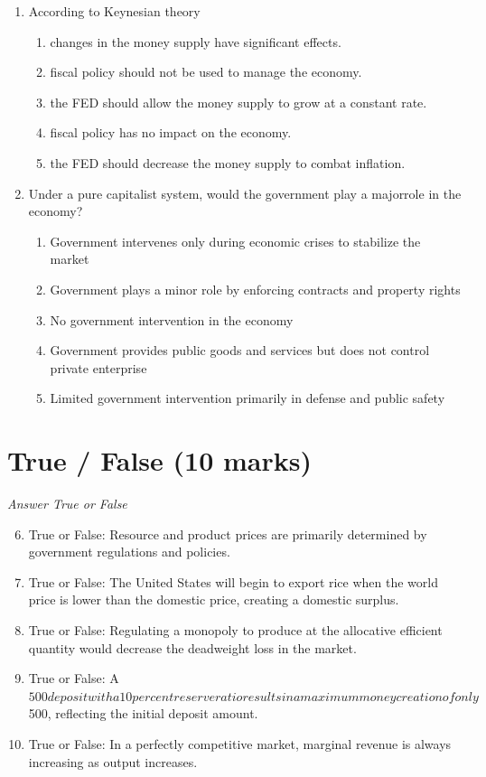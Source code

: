 \documentclass[12pt]{article}
\begin{document}
\begin{enumerate}[label=\arabic*.]
\item According to Keynesian theory
\begin{enumerate}[label=(\alph*)]
    \item changes in the money supply have significant effects.
    \item fiscal policy should not be used to manage the economy.
    \item the FED should allow the money supply to grow at a constant rate.
    \item fiscal policy has no impact on the economy.
    \item the FED should decrease the money supply to combat inflation.
\end{enumerate}
\item Under a pure capitalist system, would the government play a majorrole in the economy?
\begin{enumerate}[label=(\alph*)]
    \item Government intervenes only during economic crises to stabilize the market
    \item Government plays a minor role by enforcing contracts and property rights
    \item No government intervention in the economy
    \item Government provides public goods and services but does not control private enterprise
    \item Limited government intervention primarily in defense and public safety
\end{enumerate}
\end{enumerate}

\section*{True / False (10 marks)}
\textit{Answer True or False}
\begin{enumerate}[label=\arabic*.]
\setcounter{enumi}{5}
\item True or False: Resource and product prices are primarily determined by government regulations and policies.
\item True or False: The United States will begin to export rice when the world price is lower than the domestic price, creating a domestic surplus.
\item True or False: Regulating a monopoly to produce at the allocative efficient quantity would decrease the deadweight loss in the market.
\item True or False: A $500 deposit with a 10 percent reserve ratio results in a maximum money creation of only $500, reflecting the initial deposit amount.
\item True or False: In a perfectly competitive market, marginal revenue is always increasing as output increases.
\end{enumerate}
\end{document}
